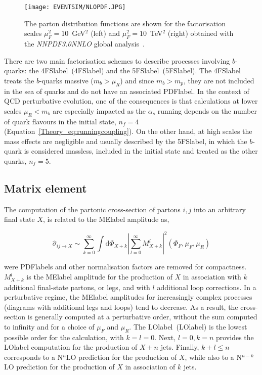 \begin{figure}[htbp]
    \RawFloats
    \begin{center}
    \texttt{[image: EVENTSIM/NLOPDF.JPG]}
    \caption{
        The parton distribution functions are shown for the factorisation scales $\mu_F^2=10$~GeV$^2$ (left) and $\mu_F^2=10$~TeV$^2$ (right) obtained with the \textit{NNPDF3.0NNLO} global analysis~\cite{Ball_2017}.}
    \label{figEVNTSIM:PDF}
    \end{center}
\end{figure}

 There are two main factorisation schemes to describe processes involving $b$-quarks: the \acrlong{4FSlabel}~(\acrshort{4FSlabel}) and the \acrlong{5FSlabel}~(\acrshort{5FSlabel}). The \acrshort{4FSlabel} treats the $b$-quarks massive ($m_b>\mu_R$) and since $m_b>m_p$, they are not included in the sea of quarks and do not have an associated \acrshort{PDFlabel}. In the context of \acrshort{QCD} perturbative evolution, one of the consequences is that calculations at lower scales $\mu_R<m_b$ are especially impacted as the $\alpha_s$ running depends on the number of quark flavours in the initial state, $n_f=4$ (Equation~\ref{Theory_eq:runningcoupling}). On the other hand, at high scales the mass effects are negligible and usually described by the \acrshort{5FSlabel}, in which the $b$-quark is considered massless, included in the initial state and treated as the other quarks, $n_f=5$. 

\subsection{Matrix element}

The computation of the partonic cross-section of partons $i,j$ into an arbitrary final state $X$, is related to the \acrshort{MElabel} amplitude as,

\begin{equation}
    \hat{\sigma}_{ij\to X} \sim \sum_{k=0}^{\infty} \int \text{d}\Phi_{X+k}\left|\sum_{l=0}^{\infty} M^l_{X+k}\right|^2(\Phi_F,\mu_F,\mu_R)
\end{equation}

were \acrshort{PDFlabel}s and other normalisation factors are removed for compactness. $M^l_{X+k}$ is the \acrshort{MElabel} amplitude for the production of $X$ in association with $k$ additional final-state partons, or legs, and with $l$ additional loop corrections. In a perturbative regime, the \acrshort{MElabel} amplitudes for increasingly complex processes (diagrams with additional legs and loops) tend to decrease. As a result, the cross-section is generally computed at a perturbative order, without the sum computed to infinity and for a choice of $\mu_F$ and $\mu_R$. The \acrlong{LOlabel}~(\acrshort{LOlabel}) is the lowest possible order for the calculation, with $k=l=0$. Next, $l=0,k=n$ provides the \acrshort{LOlabel} computation for the production of $X+n$ jets. Finally, $k+l\leq n$ corresponds to a N$^n$LO prediction for the production of $X$, while also to a N$^{n-k}$LO prediction for the production of $X$ in association of $k$ jets.

